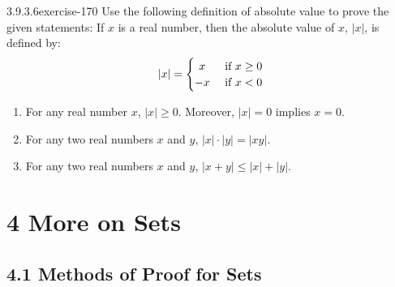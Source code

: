 \documentclass[twoside,10pt,]{book}
\numberwithin{equation}{section}
\newcommand{\lt}{<}
\begin{document}
\begin{divisionsolution}{3.9.3.6}{}{exercise-170}%
\hypertarget{p-1503}{}%
Use the following definition of absolute value to prove the given statements: If \(x\) is a real number, then the absolute value of \(x\), \(\lvert x \rvert\), is defined by:%
\begin{equation*}
\lvert x \rvert =
\begin{cases} 
\hfill x    \hfill & \text{ if }x  \geq 0 \\
\hfill -x \hfill & \text{ if }x \lt 0 \\
\end{cases}
\end{equation*}
%
\par
\hypertarget{p-1504}{}%
\leavevmode%
\begin{enumerate}[label=(\alph*)]
\item\hypertarget{li-812}{}\hypertarget{p-1505}{}%
For any real number \(x\), \(\lvert x \rvert\geq 0\). Moreover, \(\lvert  x  \rvert = 0\) implies \(x = 0\).%
\item\hypertarget{li-813}{}\hypertarget{p-1506}{}%
For any two real numbers \(x\) and \(y\), \(\lvert x \rvert\cdot  \lvert y \rvert=\lvert  x y \rvert\).%
\item\hypertarget{li-814}{}\hypertarget{p-1507}{}%
For any two real numbers \(x\) and \(y\), \(\lvert x + y \rvert\leq  \lvert x \rvert + \lvert y \rvert\).%
\end{enumerate}
%
\end{divisionsolution}%
\chapter*{4 More on Sets}
\section*{4.1 Methods of Proof for Sets}
\end{document}
